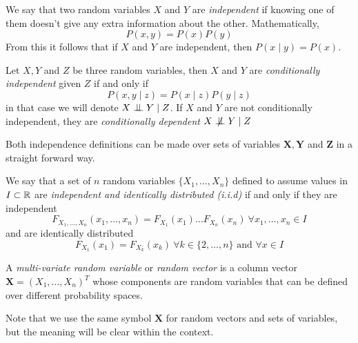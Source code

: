 \begin{definition}
We say that two random variables \(X\) and \(Y\) are \emph{independent} if knowing one of them doesn't give any extra information about the other. Mathematically,
\[
P(x,y) = P(x)P(y)
\]
From this it follows that if \(X\) and \(Y\) are independent, then \(P(x\mid y) = P(x)\).
\end{definition}


\begin{definition}
Let \(X,Y\) and \(Z\) be three random variables, then \(X\) and \(Y\) are
\emph{conditionally independent} given \(Z\) if and only if
\[
P(x,y \mid  z) = P(x\mid z)P(y\mid z)
\]
in that case we will denote \(X \bigCI Y \mid Z\). If \(X\) and \(Y\) are not
conditionally independent, they are \emph{conditionally dependent} \(X \bigCD Y \mid Z\)

\end{definition}

Both independence definitions can be made over sets of variables \(\bm{X},
\bm{Y}\) and \(\bm{Z}\) in a straight forward way.


\begin{definition}
  We say that a set of \(n\) random variables \(\{X_1,\dots,X_n\}\) defined to
  assume values in \(I \subset \mathbb{R}\) are
  \emph{independent and identically distributed (i.i.d)}
  if and only if they are independent
  \[
    F_{X_1,\dots,X_n}(x_1,\dots,x_n) = F_{X_1}(x_1)\dots F_{X_n}(x_n) \ \forall
    x_1,\dots,x_n \in I
  \]
  and are identically distributed
  \[
    F_{X_1}(x_1) = F_{X_k}(x_k) \ \forall k \in \{2,\dots,n\} \text{ and } \forall x
    \in I
  \]


\end{definition}


\begin{definition}
  A \emph{multi-variate random variable} or \emph{random vector} is a column vector \(\bm{X} =
  (X_1,\dots,X_n)^T\) whose components are random variables that can be defined
  over different probability spaces.

  Note that we use the same symbol \(\bm{X}\) for random vectors and sets of
  variables, but the meaning will be clear within the context.
\end{definition}
